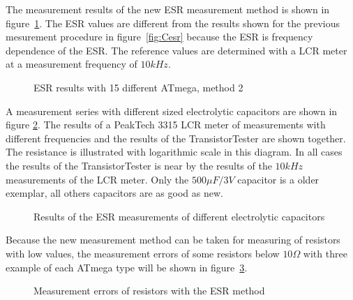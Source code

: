 The measurement results of the new ESR measurement method is shown in figure~\ref{fig:Cesr2}.
The ESR values are different from the results shown for the previous mesurement procedure in figure~\ref{fig:Cesr} because 
the ESR is frequency dependence of the ESR.
The reference values are determined with a LCR meter at a measurement frequency of \(10kHz \).

\begin{figure}[H]
\centering

\caption{ESR results with 15 different ATmega, method 2}
\label{fig:Cesr2}
\end{figure}

A measurement series with different sized electrolytic capacitors are shown in figure \ref{fig:ElcoESR}.
The results of a PeakTech 3315 LCR meter of measurements with different frequencies and the results of the
TransistorTester are shown together. The resistance is illustrated with logarithmic scale in this diagram. 
In all cases the results of the TransistorTester is near by the results of
the \(10kHz\) measurements of the LCR meter.
Only the \(500\mu F/3V\) capacitor is a older exemplar, all others capacitors are as good as new.

\begin{figure}[H]
\centering

\caption{Results of the ESR measurements of different electrolytic capacitors}
\label{fig:ElcoESR}
\end{figure}


Because the new measurement method can be taken for measuring of resistors with low values, the
measurement errors of some resistors below \(10\Omega\) with three example of each ATmega type will be shown in
figure~\ref{fig:res_esr}. 

\begin{figure}[H]
\centering

\caption{Measurement errors of resistors with the ESR method}
\label{fig:res_esr}
\end{figure}




